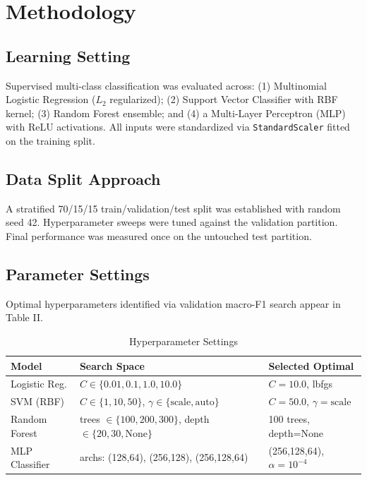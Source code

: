 \documentclass[conference]{IEEEtran}
\begin{document}
\section{Methodology}
\subsection{Learning Setting}
Supervised multi-class classification was evaluated across: (1) Multinomial Logistic Regression ($L_2$ regularized); (2) Support Vector Classifier with RBF kernel; (3) Random Forest ensemble; and (4) a Multi-Layer Perceptron (MLP) with ReLU activations. All inputs were standardized via \texttt{StandardScaler} fitted on the training split.

\subsection{Data Split Approach}
A stratified 70/15/15 train/validation/test split was established with random seed 42. Hyperparameter sweeps were tuned against the validation partition. Final performance was measured once on the untouched test partition.

\subsection{Parameter Settings}
Optimal hyperparameters identified via validation macro-F1 search appear in Table II.

\begin{table}[htbp]
\caption{Hyperparameter Settings}
\begin{center}
\begin{tabular}{lll}
\toprule
\textbf{Model} & \textbf{Search Space} & \textbf{Selected Optimal} \\
\midrule
Logistic Reg. & $C \in \{0.01, 0.1, 1.0, 10.0\}$ & $C=10.0$, lbfgs \\
SVM (RBF) & $C \in \{1, 10, 50\}$, $\gamma \in \{\text{scale}, \text{auto}\}$ & $C=50.0$, $\gamma=\text{scale}$ \\
Random Forest & trees $\in \{100,200,300\}$, depth $\in \{20,30,\text{None}\}$ & 100 trees, depth=None \\
MLP Classifier & archs: (128,64), (256,128), (256,128,64) & (256,128,64), $\alpha=10^{-4}$ \\
\bottomrule
\end{tabular}
\end{center}
\end{table}
\end{document}
